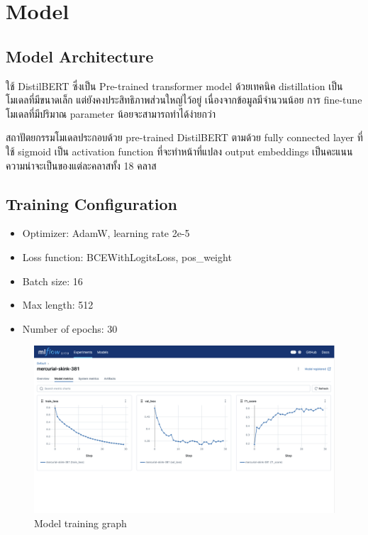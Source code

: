 \chapter{Model}

\section{Model Architecture}
ใช้ DistilBERT ซึ่งเป็น Pre-trained transformer model ด้วยเทคนิค distillation เป็นโมเดลที่มีขนาดเล็ก แต่ยังคงประสิทธิภาพส่วนใหญ่ไว้อยู่ \cite{victor2019distilbert} เนื่องจากข้อมูลมีจำนวนน้อย การ fine-tune โมเดลที่มีปริมาณ parameter น้อยจะสามารถทำได้ง่ายกว่า

สถาปัตยกรรมโมเดลประกอบด้วย pre-trained DistilBERT ตามด้วย fully connected layer ที่ใช้ sigmoid เป็น activation function ที่จะทำหน้าที่แปลง output embeddings เป็นคะแนนความน่าจะเป็นของแต่ละคลาสทั้ง 18 คลาส

\section{Training Configuration}
\begin{itemize}
    \item Optimizer: AdamW, learning rate 2e-5
    \item Loss function: BCEWithLogitsLoss, pos\_weight
    \item Batch size: 16
    \item Max length: 512
    \item Number of epochs: 30
\end{itemize}
\clearpage

\begin{figure}[ht]
    \centering
    \includegraphics[width=\imgwidth]
    {images/model_training_graph.jpg}
    \caption{Model training graph}
    \label{fig:model_training_graph}
\end{figure}

